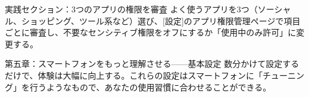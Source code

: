 \begin{tcbinfo}{実践セクション：3つのアプリの権限を審査}
よく使うアプリを3つ（ソーシャル、ショッピング、ツール系など）選び、[設定]のアプリ権限管理ページで項目ごとに審査し、不要なセンシティブ権限をオフにするか「使用中のみ許可」に変更する。

\end{tcbinfo}

\begin{tcbpractice}{第五章：スマートフォンをもっと理解させる——基本設定}
数分かけて設定するだけで、体験は大幅に向上する。これらの設定はスマートフォンに「チューニング」を行うようなもので、あなたの使用習慣に合わせることができる。

\end{tcbpractice}

